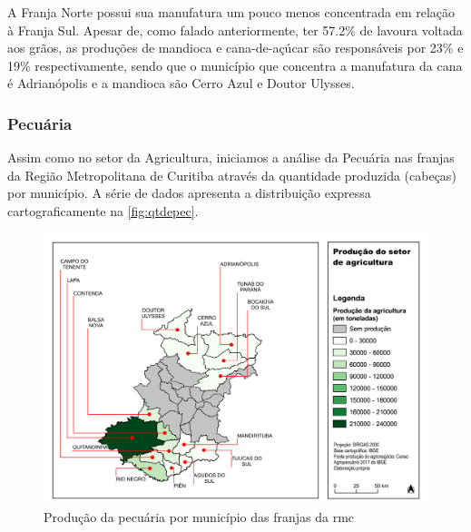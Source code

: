 	A Franja Norte possui sua manufatura um pouco menos concentrada em relação à Franja Sul. Apesar de, como falado anteriormente, ter 57.2\% de lavoura voltada aos grãos, as produções de mandioca e cana-de-açúcar são responsáveis por 23\% e 19\% respectivamente, sendo que o município que concentra a manufatura da cana é Adrianópolis e a mandioca são Cerro Azul e Doutor Ulysses.
	
	\subsubsection{Pecuária}
	
	Assim como no setor da Agricultura, iniciamos a análise da Pecuária nas franjas da Região Metropolitana de Curitiba através da quantidade produzida (cabeças) por município. A série de dados apresenta a distribuição expressa cartograficamente na \autoref{fig:qtdepec}.
	
	\begin{landscape}
		\begin{figure}
			\centering
			\caption{Produção da pecuária por município das franjas da \gls{rmc}}
			\label{fig:qtdepec}
			\includegraphics[width=0.85\linewidth]{../gis/produtos/RMC_censorural_QTDE_PRODUZIDA_AGRO}
		\end{figure}
	\end{landscape}

